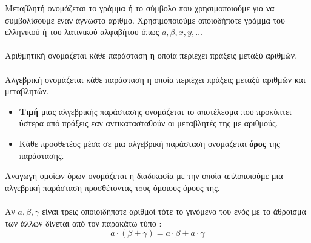 \documentclass[twoside,nofonts,internet,shmeiwseis]{thewria}
\begin{document}
\orismoi
{}
Μεταβλητή ονομάζεται το γράμμα ή το σύμβολο που χρησιμοποιούμε για να συμβολίσουμε έναν άγνωστο αριθμό. Χρησιμοποιούμε οποιοδήποτε γράμμα του ελληνικού ή του λατινικού αλφαβήτου όπως $ a,\beta,x,y,\ldots $\\\\
Αριθμητική ονομάζεται κάθε παράσταση η οποία περιέχει πράξεις μεταξύ αριθμών.\\\\
Αλγεβρική ονομάζεται κάθε παράσταση η οποία περιέχει πράξεις μεταξύ αριθμών και μεταβλητών.
\begin{itemize}[itemsep=0mm]
\item \textbf{Tιμή} μιας αλγεβρικής παράστασης ονομάζεται το αποτέλεσμα που προκύπτει ύστερα από πράξεις εαν αντικατασταθούν οι μεταβλητές της με αριθμούς.
\item Κάθε προσθετέος μέσα σε μια αλγεβρική παράσταση ονομάζεται \textbf{όρος} της παράστασης.
\end{itemize}
Αναγωγή ομοίων όρων ονομάζεται η διαδικασία με την οποία απλοποιούμε μια αλγεβρική παράσταση προσθέτοντας τoυς όμοιους όρους της.\\\\
\thewrhmata
{}
Αν $ a,\beta,\gamma $ είναι τρεις οποιοιδήποτε αριθμοί τότε το γινόμενο του ενός με το άθροισμα των άλλων δίνεται από τον παρακάτω τύπο :
\[ a\cdot(\beta+\gamma)=a\cdot\beta+a\cdot\gamma \]
\end{document}
